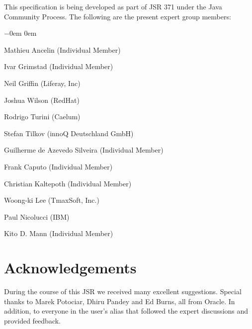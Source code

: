 This specification is being developed as part of JSR 371 under the Java Community Process. The following are the present expert
group members:

\begin{list}{$-$}{\parsep 0em  0em}
\item Mathieu Ancelin (Individual Member)
\item Ivar Grimstad (Individual Member)
\item Neil Griffin (Liferay, Inc)
\item Joshua Wilson (RedHat)
\item Rodrigo Turini (Caelum)
\item Stefan Tilkov (innoQ Deutschland GmbH)
\item Guilherme de Azevedo Silveira (Individual Member)
\item Frank Caputo (Individual Member)
\item Christian Kaltepoth (Individual Member)
\item Woong-ki Lee (TmaxSoft, Inc.)
\item Paul Nicolucci (IBM)
\item Kito D. Mann (Individual Member)
\end{list}

\section{Acknowledgements}
\label{acks}

During the course of this JSR we received many excellent suggestions. Special thanks to Marek
Potociar, Dhiru Pandey and Ed Burns, all from Oracle. In addition, to everyone in the user's alias
that followed the expert discussions and provided feedback.

